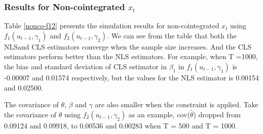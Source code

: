 \documentclass[a4paper,12pt,times,numbered,print,index]{report}
\numberwithin{equation}{section}
\begin{document}
\subsubsection{Results for Non-cointegrated $x_t$}

Table \ref{nonco-f12} presents the simulation results for non-cointegrated $x_t$ using $f_1 (u_{t-1}, \gamma_1)$ and $f_2 (u_{t-1}, \gamma_2)$. We can see from the table that both the NLSand CLS estimators converge when the sample size increases. And the CLS estimators perform better than the NLS estimators. For example, when T =1000, the bias and standard deviation of CLS estimator in $\beta_{1}$ in $f_1 (u_{t-1}, \gamma_1)$ is -0.00007 and 0.01574 respectively, but the values for the NLS estimator is 0.00154 and 0.02500. 

The covariance of $\theta$, $\beta$ and $\gamma$ are also smaller when the constraint is applied. Take the covariance of $\theta$ using  $f_2 (u_{t-1}, \gamma_2)$ as an example, cov($\hat{\theta}$) dropped from 0.09124 and 0.09918, to 0.00536 and 0.00283 when T = 500 and T = 1000.
\end{document}
